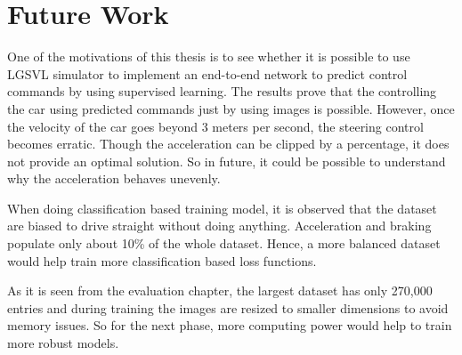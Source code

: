 \chapter{Future Work}
One of the motivations of this thesis is to see whether it is possible to use LGSVL
simulator to implement an end-to-end network to predict control commands by using
supervised learning. The results prove that the controlling the car using predicted
commands just by using images is possible.
However, once the velocity of the car goes beyond 3 meters per second, the steering
control becomes erratic. Though the acceleration can be clipped by a percentage, it does
not provide an optimal solution. So in future, it could be possible to understand why the
acceleration behaves unevenly.

When doing classification based training model, it is observed that the dataset are
biased to drive straight without doing anything. Acceleration and braking populate only
about 10\% of the whole dataset. Hence, a more balanced dataset would help train more
classification based loss functions.

As it is seen from the evaluation chapter, the largest dataset has only 270,000 entries
and during training the images are resized to smaller dimensions to avoid memory issues.
So for the next phase, more computing power would help to train more robust models.

